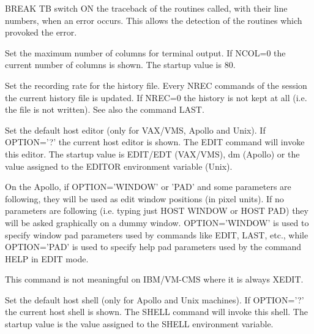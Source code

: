 BREAK TB switch ON the traceback of the routines called, with their
line numbers, when an error occurs. This allows the detection of
the routines which provoked the error.
\ENDTEXT

\BEGARG
{}
\ENDARG
\BEGTEXT
Set the maximum number of columns for terminal output.
If NCOL=0 the current number of columns is shown.
The startup value is 80.
\ENDTEXT

\BEGARG
{}
\ENDARG
\BEGTEXT
Set the recording rate for the history file.
Every NREC commands of the session the current history file is updated.
If NREC=0 the history is not kept at all (i.e. the file is not written).
See also the command LAST.
\ENDTEXT

\BEGARG
{}
\ENDARG
\BEGTEXT
Set the default host editor (only for VAX/VMS, Apollo and Unix).
If OPTION='?' the current host editor is shown.
The EDIT command will invoke this editor.
The startup value is EDIT/EDT (VAX/VMS), dm (Apollo) or the value
assigned to the EDITOR environment variable (Unix).

On the Apollo, if OPTION='WINDOW' or 'PAD' and some parameters are
following, they will be used as edit window positions (in pixel units).
If no parameters are following (i.e. typing just HOST WINDOW or HOST PAD)
they will be asked graphically on a dummy window.
OPTION='WINDOW' is used to specify window pad parameters used by
commands like EDIT, LAST, etc., while OPTION='PAD' is used to specify help
pad parameters used by the command HELP in EDIT mode.

This command is not meaningful on IBM/VM-CMS where it is always XEDIT.
\ENDTEXT

\BEGARG
{}
\ENDARG
\BEGTEXT
Set the default host shell (only for Apollo and Unix machines).
If OPTION='?' the current host shell is shown.
The SHELL command will invoke this shell.
The startup value is the value assigned to the SHELL environment variable.
\ENDTEXT

